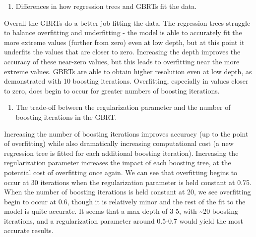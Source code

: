 \documentclass[11pt]{article}
\providecommand{\tightlist}{%
      \setlength{\itemsep}{0pt}\setlength{\parskip}{0pt}}
\begin{document}
    \begin{enumerate}
\def\labelenumi{\arabic{enumi}.}
\setcounter{enumi}{1}
\tightlist
\item
  Differences in how regression trees and GBRTs fit the data.
\end{enumerate}

    Overall the GBRTs do a better job fitting the data. The regression trees
struggle to balance overfitting and underfitting - the model is able to
accurately fit the more extreme values (further from zero) even at low
depth, but at this point it underfits the values that are closer to
zero. Increasing the depth improves the accuracy of these near-zero
values, but this leads to overfitting near the more extreme values.
GBRTs are able to obtain higher resolution even at low depth, as
demonstrated with 10 boosting iterations. Overfitting, especially in
values closer to zero, does begin to occur for greater numbers of
boosting iterations.

    \begin{enumerate}
\def\labelenumi{\arabic{enumi}.}
\setcounter{enumi}{2}
\tightlist
\item
  The trade-off between the regularization parameter and the number of
  boosting iterations in the GBRT.
\end{enumerate}

    Increasing the number of boosting iterations improves accuracy (up to
the point of overfitting) while also dramatically increasing
computational cost (a new regression tree is fitted for each additional
boosting iteration). Increasing the regularization parameter increases
the impact of each boosting tree, at the potential cost of overfitting
once again. We can see that overfitting begins to occur at 30 iterations
when the regularization parameter is held constant at 0.75. When the
number of boosting iterations is held constant at 20, we see overfitting
begin to occur at 0.6, though it is relatively minor and the rest of the
fit to the model is quite accurate. It seems that a max depth of 3-5,
with \textasciitilde{}20 boosting iterations, and a regularization
parameter around 0.5-0.7 would yield the most accurate results.


    
    
    
    
\end{document}
